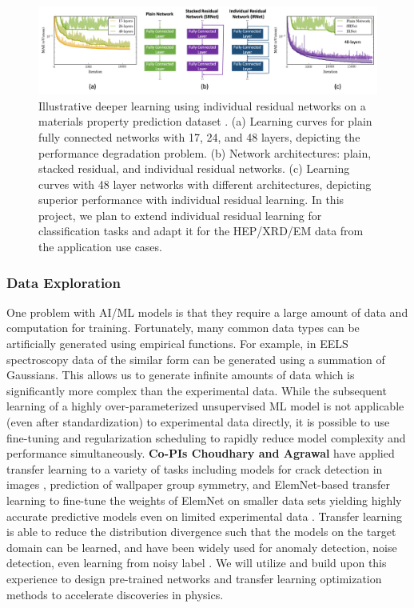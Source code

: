\begin{figure}[tbh]
\centering
  \includegraphics[keepaspectratio, width=\textwidth]{proposal/img/DeeperLearning.png}
  \caption{Illustrative deeper learning using individual residual networks on a materials property prediction dataset \cite{Jha_KDD19}. (a) Learning curves for plain fully connected networks with 17, 24, and 48 layers, depicting the performance degradation problem. (b) Network architectures: plain, stacked residual, and individual residual networks. (c) Learning curves with 48 layer networks with different architectures, depicting superior performance with individual residual learning. In this project, we plan to extend individual residual learning for classification tasks and adapt it for the HEP/XRD/EM data from the application use cases. }
  \label{fig:deeperlearning}
\end{figure}


\subsubsection{Data Exploration}

 
 
One problem with AI/ML models is that they require a large amount of data and computation for training. Fortunately, many common data types can be artificially generated using empirical functions. For example, in EELS spectroscopy data of the similar form can be generated using a summation of Gaussians. This allows us to generate infinite amounts of data which is significantly more complex than the experimental data. While the subsequent learning of a highly over-parameterized unsupervised ML model is not applicable (even after standardization) to experimental data directly, it is possible to use fine-tuning and regularization scheduling to rapidly reduce model complexity and performance simultaneously. \textbf{Co-PIs Choudhary and Agrawal} have applied transfer learning to a variety of tasks including models for crack detection in images \cite{Gopalakrishnan_CBM17}, prediction of wallpaper group symmetry, and ElemNet-based transfer learning to fine-tune the weights of ElemNet \cite{Jha_SciRep18} on smaller data sets yielding highly accurate predictive models even on limited experimental data \cite{Jha_NatComm19}. Transfer learning is able to reduce the distribution divergence such that the models on the target domain can be learned, and have been widely used for anomaly detection, noise detection, even learning from noisy label \cite{aghamaleki2018transfer,lee2018cleannet,andrews2016transfer}.
We will utilize and build upon this experience to design pre-trained networks and transfer learning optimization methods to accelerate discoveries in physics. 

